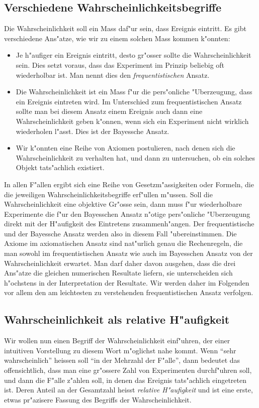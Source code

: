 \subsection{Verschiedene Wahrscheinlichkeitsbegriffe}
Die Wahrscheinlichkeit soll ein Mass daf"ur sein, dass Ereignis
eintritt.
Es gibt verschiedene Ans"atze, wie wir zu einem solchen Mass kommen
k"onnten:
\begin{itemize}
\item 
Je h"aufiger ein Ereignis eintritt, desto gr"osser sollte die
Wahrscheinlichkeit sein.
Dies setzt voraus, dass das Experiment im Prinzip beliebig oft wiederholbar 
ist.
Man nennt dies den {\em frequentistischen} Ansatz.
\item
Die Wahrscheinlichkeit ist ein Mass f"ur die pers"onliche
"Uberzeugung, dass ein Ereignis eintreten wird.
Im Unterschied zum frequentistischen Ansatz sollte man bei diesem
Ansatz einem Ereignis auch dann eine Wahrscheinlichkeit geben k"onnen,
wenn sich ein Experiment nicht wirklich wiederholen l"asst.
Dies ist der Bayessche Ansatz.
\item
Wir k"onnten eine Reihe von Axiomen postulieren, nach denen sich
die Wahrscheinlichkeit zu verhalten hat, und dann zu untersuchen,
ob ein solches Objekt tats"achlich existiert.
\end{itemize}
In allen F"allen ergibt sich eine Reihe von Gesetzm"assigkeiten
oder Formeln, die die jeweiligen Wahrscheinlichkeitsbegriffe 
erf"ullen m"ussen.
Soll die Wahrscheinlichkeit eine objektive Gr"osse sein, dann
muss f"ur wiederholbare Experimente die f"ur den Bayesschen
Ansatz n"otige pers"onliche "Uberzeugung direkt mit der H"aufigkeit
des Eintretens zusammenh"angen.
Der frequentistische und der Bayessche Ansatz werden also in diesem
Fall "ubereinstimmen.
Die Axiome im axiomatischen Ansatz sind nat"urlich genau die
Rechenregeln, die man sowohl im frequentistischen Ansatz wie
auch im Bayesschen Ansatz von der Wahrscheinlichkeit erwartet.
Man darf daher davon ausgehen, dass die drei Ans"atze die gleichen numerischen
Resultate liefern, sie unterscheiden sich h"ochstens in der Interpretation
der Resultate.
Wir werden daher im Folgenden vor allem den am leichtesten zu
verstehenden frequentistischen Ansatz verfolgen.

\subsection{Wahrscheinlichkeit als relative H"aufigkeit}
Wir wollen nun einen Begriff der Wahrscheinlichkeit einf"uhren, der
einer intuitiven Vorstellung zu diesem Wort m"oglichst nahe kommt.
Wenn ``sehr
wahrscheinlich'' heissen soll ``in der Mehrzahl der F"alle'', dann
bedeutet das offensichtlich, dass man eine gr"ossere Zahl von
Experimenten durchf"uhren soll, und dann die F"alle z"ahlen soll,
in denen das Ereignis tats"achlich eingetreten ist.
Deren Anteil
an der Gesamtzahl heisst {\em relative H"aufigkeit} und ist eine erste,
etwas pr"azisere Fassung des Begriffs der Wahrscheinlichkeit.

